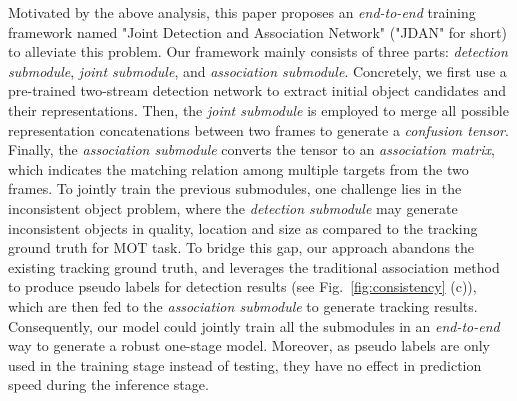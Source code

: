 \documentclass[acmsmall]{acmart}
\begin{document}
{
Motivated by the above analysis, this paper proposes an \emph{end-to-end} training framework named "Joint Detection and Association Network" ("JDAN" for short) to alleviate this problem. 
Our framework mainly consists of three parts: \emph{detection submodule}, \emph{joint submodule}, and \emph{association submodule}. 
Concretely, we first use a pre-trained two-stream detection network to extract initial object candidates and their representations. 
Then, the \emph{joint submodule} is employed to merge all possible representation concatenations between two frames to generate a \emph{confusion tensor}. 
Finally, the \emph{association submodule} converts the tensor to an \emph{association matrix}, which indicates the matching relation among multiple targets from the two frames. 
To jointly train the previous submodules, one challenge lies in the inconsistent object problem,
where the \emph{detection submodule} may generate inconsistent objects in quality, location and size as compared to the tracking ground truth for MOT task. 
To bridge this gap, our approach abandons the existing tracking ground truth,
and leverages the traditional association method~\cite{welch1995introduction} to produce pseudo labels for detection results (see Fig.~\ref{fig:consistency} (c)), 
which are then fed to the \emph{association submodule} to generate tracking results. 
Consequently, our model could jointly train all the submodules in an \emph{end-to-end} way to generate a robust one-stage model. 
Moreover, as pseudo labels are only used in the training stage instead of testing, they have no effect in prediction speed during the inference stage.
}
\end{document}
